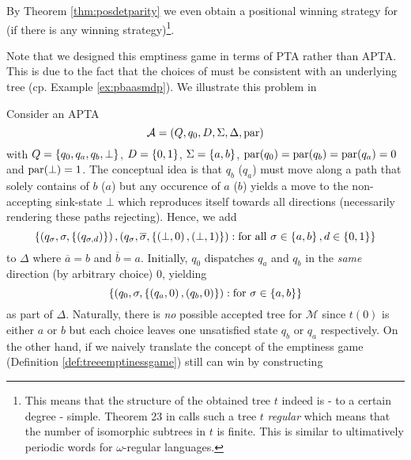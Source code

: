 By Theorem \ref{thm:posdetparity} we even obtain a positional winning strategy 
for \eve{} (if there is any winning strategy)\footnote{
  This means that the structure of the obtained tree $t$ indeed is - to a
  certain degree - simple. Theorem 23 in \cite{ParityGamesPosDet} calls such a
  tree $t$ \emph{regular} which means that the number of isomorphic subtrees in
  $t$ is finite. This is similar to ultimatively periodic words for
  $\omega$-regular languages.
}.

Note that we designed this emptiness game in terms of \ac{PTA} rather than 
\ac{APTA}. This is due to the fact that the choices of \eve{} must be 
consistent with an underlying tree (cp. Example \ref{ex:pbaasmdp}). We 
illustrate this problem in
\begin{example}
  Consider an \ac{APTA}
  \begin{equation*}
    \mathcal{A} = \left(Q, q_{0}, D, \Sigma, \Delta, \operatorname{par}\right)
  \end{equation*}
  with $Q = \left\{q_{0}, q_{a}, q_{b}, \bot\right\}$, $D = \left\{0,1\right\}$, 
  $\Sigma = \left\{a, b\right\}$, $\operatorname{par}(q_{0}) = \operatorname{par}(q_{b}) = \operatorname{par}(q_{a}) 
    = 0$ and $\operatorname{par}(\bot) = 1$. The conceptual idea is that $q_{b}$ ($q_{a}$) 
  must move along a path that solely contains of $b$ ($a$) but any occurence of 
  $a$ ($b$) yields a move to the non-accepting sink-state $\bot$ which 
  reproduces itself towards all directions (necessarily rendering these paths
  rejecting). Hence, we add 
  \begin{equation*}
    \left\{
      \left(q_{\sigma}, \sigma, \left\{\left(q_{\sigma, d}\right)\right\}\right),
      \left(q_{\sigma}, \overline{\sigma}, \left\{\left(\bot, 0\right), 
        \left(\bot, 1\right)\right\}\right):\text{for all }\sigma\in\left\{a,b\right\}, d\in\left\{0,1\right\}
    \right\}
  \end{equation*}
  to $\Delta$ where $\overline{a} = b$ and $\overline{b} = a$. Initially, 
  $q_{0}$ dispatches $q_{a}$ and $q_{b}$ in the \emph{same} direction (by 
  arbitrary choice) $0$, yielding
  \begin{equation*}
    \left\{
      \left(q_{0}, \sigma, \left\{\left(q_{a}, 0\right), \left(q_{b}, 0\right)\right\}\right):
        \text{for }\sigma\in\left\{a, b\right\}
      \right\}
  \end{equation*}
  as part of $\Delta$. Naturally, there is \emph{no} possible accepted tree for 
  $\mathcal{M}$ since $t(0)$ is either $a$ or $b$ but each choice leaves one
  unsatisfied state $q_{b}$ or $q_{a}$ respectively. On the other hand, if we
  naively translate the concept of the emptiness game (Definition 
  \ref{def:treeemptinessgame}) \eve{} still can win by constructing 

\end{example}

